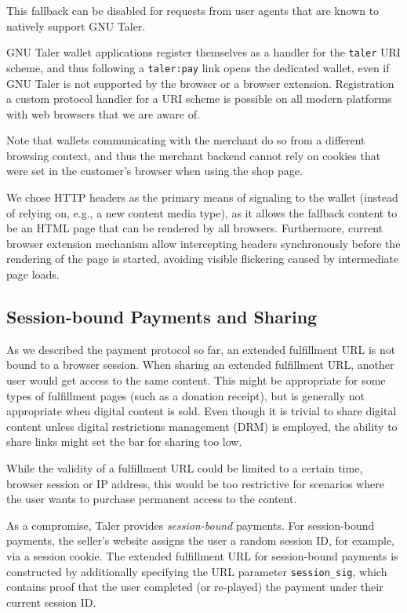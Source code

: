 This fallback can be disabled for requests from user agents that are known to
natively support GNU Taler.

GNU Taler wallet applications register themselves as a handler for the
\texttt{taler} URI scheme, and thus following a \texttt{taler:pay} link opens
the dedicated wallet, even if GNU Taler is not supported by the browser or a
browser extension.  Registration a custom protocol handler for a URI scheme is
possible on all modern platforms with web browsers that we are aware of.

Note that wallets communicating with the merchant do so from a different
browsing context, and thus the merchant backend cannot rely on cookies that
were set in the customer's browser when using the shop page.

We chose HTTP headers as the primary means of signaling to the wallet (instead
of relying on, e.g., a new content media type), as it allows the fallback content
to be an HTML page that can be rendered by all browsers. Furthermore,
current browser extension mechanism allow intercepting headers synchronously
before the rendering of the page is started, avoiding visible flickering caused by
intermediate page loads.

\subsection{Session-bound Payments and Sharing}
As we described the payment protocol so far, an extended fulfillment URL
is
not bound to a browser session.  When sharing an extended fulfillment
URL, another user would get access to the same content.  This might be appropriate
for some types of fulfillment pages (such as a donation receipt), but is generally not
appropriate when digital content is sold.  Even though it is trivial to share digital content
unless digital restrictions management (DRM) is employed, the ability to share
links might set the bar for sharing too low.

While the validity of a fulfillment URL could be limited to a certain time,
browser session or IP address, this would be too restrictive for scenarios where
the user wants to purchase permanent access to the content.

As a compromise, Taler provides \emph{session-bound} payments.  For
session-bound payments, the seller's website assigns the user a random session
ID, for example, via a session cookie.  The extended fulfillment URL for
session-bound payments is constructed by additionally specifying the URL
parameter \texttt{session\_sig}, which contains proof that the user completed
(or re-played) the payment under their current session ID.

